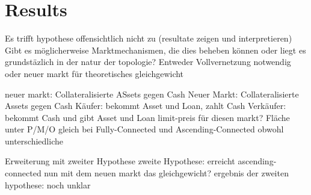 \documentclass[Bachelorarbeit.tex]{subfiles}
\begin{document}
\chapter{Results}
Es trifft hypothese offensichtlich nicht zu (resultate zeigen und interpretieren)
		Gibt es möglicherweise Marktmechanismen, die dies beheben können oder liegt es grundstäzlich in der natur der topologie?
		Entweder Vollvernetzung notwendig oder neuer markt für theoretisches gleichgewicht
		
		neuer markt: Collateralisierte ASsets gegen Cash			
			Neuer Markt: Collateralisierte Assets gegen Cash
			Käufer: 		bekommt Asset und Loan, zahlt Cash
			Verkäufer: 		bekommt Cash und gibt Asset und Loan
			limit-preis für diesen markt?
			Fläche unter P/M/O gleich bei Fully-Connected und Ascending-Connected obwohl unterschiedliche
	
	Erweiterung mit zweiter Hypothese
		zweite Hypothese: erreicht ascending-connected nun mit dem neuen markt das gleichgewicht?
		ergebnis der zweiten hypothese: noch unklar
\end{document}
